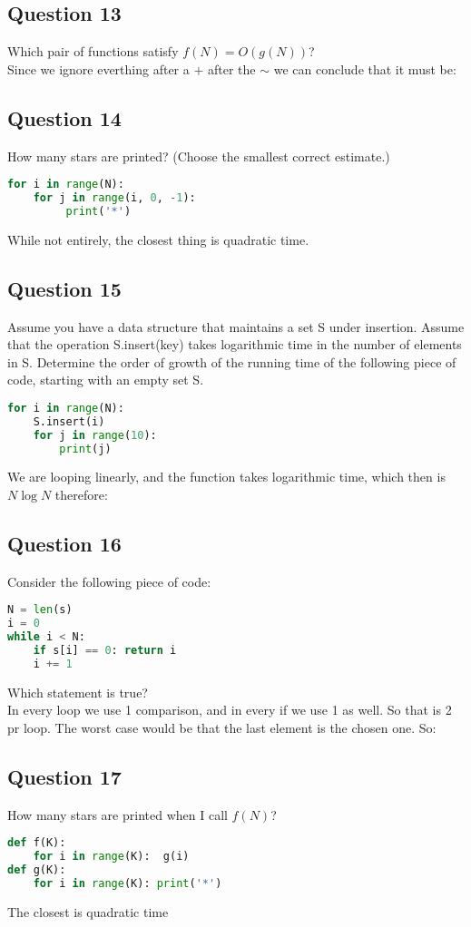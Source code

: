 \subsection{Question 13}
Which pair of functions satisfy $f(N)=O(g(N))$?\\
Since we ignore everthing after a $+$ after the $\sim$ we can conclude that it must be:\\[1ex]


\subsection{Question 14}
How many stars are printed? (Choose the smallest correct estimate.) 
\begin{lstlisting}[language=python]
for i in range(N):
    for j in range(i, 0, -1):
         print('*')
\end{lstlisting}
While not entirely, the closest thing is quadratic time.\\[1ex]


\subsection{Question 15}
Assume you have a data structure that maintains a set S under insertion. Assume that the operation S.insert(key) takes logarithmic time in the number of elements in S. Determine the order of growth of the running time of the following piece of code, starting with an empty set S.
\begin{lstlisting}[language=python]
for i in range(N):
    S.insert(i)
    for j in range(10):
        print(j)
\end{lstlisting}
We are looping linearly, and the function takes logarithmic time, which then is $N \log N$ therefore:\\[1ex]


\subsection{Question 16}
Consider the following piece of code:
\begin{lstlisting}[language=python]
N = len(s)
i = 0
while i < N:
    if s[i] == 0: return i
    i += 1
\end{lstlisting}
Which statement is true?\\
In every loop we use 1 comparison, and in every if we use 1 as well.
So that is 2 pr loop. The worst case would be that the last element is the chosen one. So:\\[1ex]


\subsection{Question 17}
How many stars are printed when I call $f(N)$?
\begin{lstlisting}[language=python]
def f(K):
    for i in range(K):  g(i)
def g(K):
    for i in range(K): print('*')
\end{lstlisting}
The closest is quadratic time\\[1ex]
